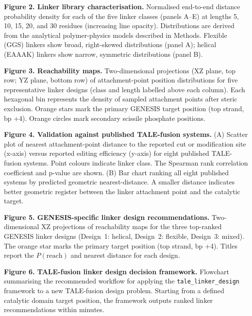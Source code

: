 \documentclass[11pt,a4paper]{article}
\newcommand{\preach}{P(\mathrm{reach})}
\newcommand{\pkg}{\texttt{tale\_linker\_design}}
\begin{document}
\vspace{0.8em}
\noindent\textbf{Figure 2. Linker library characterisation.}
Normalised end-to-end distance probability density for each of the five linker classes
(panels A--E) at lengths 5, 10, 15, 20, and 30 residues (increasing line opacity).
Distributions are derived from the analytical polymer-physics models described in
Methods. Flexible (GGS) linkers show broad, right-skewed distributions (panel A);
helical (EAAAK) linkers show narrow, symmetric distributions (panel B).

\vspace{0.8em}
\noindent\textbf{Figure 3. Reachability maps.}
Two-dimensional projections (XZ plane, top row; YZ plane, bottom row) of attachment-point
position distributions for five representative linker designs (class and length labelled
above each column). Each hexagonal bin represents the density of sampled attachment
points after steric exclusion. Orange stars mark the primary GENESIS target position
(top strand, bp +4). Orange circles mark secondary scissile phosphate positions.

\vspace{0.8em}
\noindent\textbf{Figure 4. Validation against published TALE-fusion systems.}
(A) Scatter plot of nearest attachment-point distance to the reported cut or modification
site (x-axis) versus reported editing efficiency (y-axis) for eight published TALE-fusion
systems. Point colours indicate linker class. The Spearman rank correlation coefficient
and p-value are shown. (B) Bar chart ranking all eight published systems by predicted
geometric nearest-distance. A smaller distance indicates better geometric register
between the linker attachment point and the catalytic target.

\vspace{0.8em}
\noindent\textbf{Figure 5. GENESIS-specific linker design recommendations.}
Two-dimensional XZ projections of reachability maps for the three top-ranked GENESIS
linker designs (Design~1: helical, Design~2: flexible, Design~3: mixed). The orange
star marks the primary target position (top strand, bp +4). Titles report the
$\preach$ and nearest distance for each design.

\vspace{0.8em}
\noindent\textbf{Figure 6. TALE-fusion linker design decision framework.}
Flowchart summarising the recommended workflow for applying the \pkg{} framework
to a new TALE-fusion design problem. Starting from a defined catalytic domain
target position, the framework outputs ranked linker recommendations within minutes.




\end{document}

